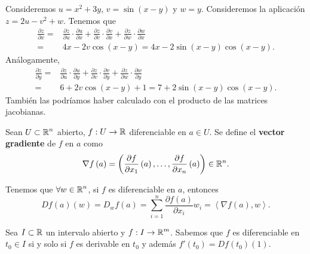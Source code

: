 \begin{eg}
Consideremos $\displaystyle u = x^{2}+3y $, $\displaystyle v = \sin\left(x-y\right) $ y $\displaystyle w = y $. Consideremos la aplicación $\displaystyle z = 2u-v^{2}+w $. Tenemos que 
\[
\begin{split}
	\frac{\partial z}{\partial x} = & \frac{\partial z}{\partial u} \cdot \frac{\partial u}{ \partial x} + \frac{\partial z}{\partial v} \cdot \frac{\partial v}{\partial x} + \frac{\partial z}{\partial w} \cdot \frac{\partial w}{\partial x} \\
	= &  4x -2v\cos\left(x-y\right) = 4x -2\sin\left(x-y\right)\cos\left(x-y\right).
\end{split}
\]
Análogamente, 
\[
\begin{split}
	\frac{\partial z}{\partial y} = & \frac{\partial z}{\partial u} \cdot \frac{\partial u}{ \partial y} + \frac{\partial z}{\partial v} \cdot \frac{\partial v}{\partial y} + \frac{\partial z}{\partial w} \cdot \frac{\partial w}{\partial y} \\
	= &  6 +2v\cos\left(x-y\right) + 1 = 7 + 2\sin\left(x-y\right)\cos\left(x-y\right).
\end{split}
\]
También las podríamos haber calculado con el producto de las matrices jacobianas. 
\end{eg}
\begin{definition}
Sean $\displaystyle U \subset \mathbb{R}^{n} $ abierto, $\displaystyle f : U \to \mathbb{R} $ diferenciable en $\displaystyle a \in U $. Se define el \textbf{vector gradiente} de $\displaystyle f $ en $\displaystyle a $ como 
\[\nabla f\left(a\right)= \left(\frac{\partial f}{\partial x_{1}}\left(a\right), \ldots, \frac{\partial f}{\partial x_{n}}\left(a\right)\right) \in \mathbb{R}^{n} .\]
\end{definition}
\begin{observation}
Tenemos que $\displaystyle \forall w \in \mathbb{R}^{n} $, si $\displaystyle f $ es diferenciable en $\displaystyle a $, entonces
\[Df\left(a\right)\left(w\right) =D_{w}f\left(a\right) = \sum^{n}_{i = 1}\frac{\partial f\left(a\right)}{\partial x_{i}}w_{i} = \left\langle \nabla f\left(a\right), w \right\rangle  .\]
\end{observation}
\begin{observation}
Sea $\displaystyle I \subset \mathbb{R} $ un intervalo abierto y $\displaystyle f : I \to \mathbb{R}^{m} $. Sabemos que $\displaystyle f $ es diferenciable en $\displaystyle t_{0} \in I $ si y solo si $\displaystyle f $ es derivable en $\displaystyle t_{0} $ y además $\displaystyle f'\left(t_{0}\right) = Df\left(t_{0}\right)\left(1\right) $. 
\end{observation}
